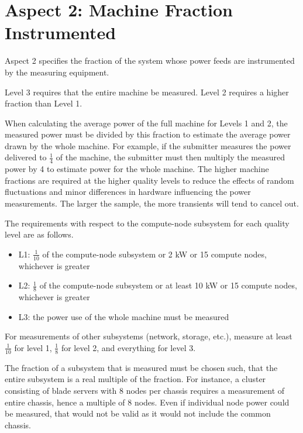 \section{Aspect 2: Machine Fraction Instrumented}
\label{sec:A2MFI}
\noindent
Aspect 2 specifies the fraction of the system whose power feeds are instrumented by the measuring equipment. 
\wl

\noindent
Level 3 requires that the entire machine be measured. Level 2 requires a higher fraction than Level 1.
\wl

\noindent
When calculating the average power of the full machine for Levels 1 and 2, the measured power must be divided by this fraction to 
estimate the average power drawn by the whole machine. For example, if the submitter measures the power delivered 
to $ \frac{1}{4} $ of the machine, the submitter must then multiply the measured power by 4 to estimate power for the whole machine.  
The higher machine fractions are required at the higher quality levels to reduce the effects of random fluctuations and minor differences in hardware influencing the power measurements.  The larger the sample, the more transients will tend to cancel out.
\wl

\noindent
The requirements with respect to the compute-node subsystem for each quality level are as follows.

\begin{itemize}
\item
L1: $\frac{1}{10}$ of the compute-node subsystem or 2 kW or 15 compute nodes, whichever is greater
\item
L2: $\frac{1}{8}$ of the compute-node subsystem or at least 10 kW or 15 compute nodes, whichever is greater
\item
L3: the power use of the whole machine must be measured
\end{itemize}

\noindent
For measurements of other subsystems (network, storage, etc.), measure at least $\frac{1}{10}$ for level 1, $\frac{1}{8}$ for level 2, and everything for level 3.
\wl

\noindent
The fraction of a subsystem that is measured must be chosen such, that the entire subsystem is a real multiple of the fraction.
For instance, a cluster consisting of blade servers with 8 nodes per chassis requires a measurement of entire chassis, hence a multiple of 8 nodes.
Even if individual node power could be measured, that would not be valid as it would not include the common chassis.
\wl

